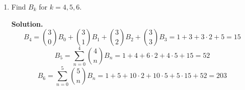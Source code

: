 \documentclass{book}
\begin{document}
\begin{activity}[]
\begin{enumerate}[font=\bfseries,label=(\alph*),ref=\alph*]
\item\label{task-219} \hypertarget{p-1144}{}%
Find \(B_k\) for \(k=4,5,6\).%
\par\smallskip%
\noindent\textbf{Solution.}\hypertarget{solution-107}{}\quad%
\hypertarget{p-1145}{}%
%
\begin{equation*}
B_4 =\binom{3}{0}B_0 +\binom{3}{1}B_1 +\binom{3}{2}B_2 +
\binom{3}{3}B_3=1 +3+3\cdot2 +5=15
\end{equation*}
%
\begin{equation*}
B_5 = \sum_{n=0}^4 \binom{4}{n}B_n = 1 +4+6\cdot2 +4\cdot5 + 15=52
\end{equation*}
%
\begin{equation*}
B_6 = \sum_{n=0}^5 \binom{5}{n}B_n =1+5 +10\cdot2 +10\cdot 5
+5\cdot 15 +52=203
\end{equation*}
%
\end{enumerate}
\end{activity}
\end{document}

